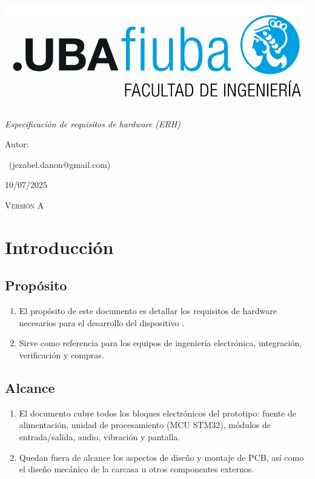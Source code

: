 \documentclass[11pt,a4paper]{article}
\newcommand{\versionActual}{A}
\newcommand{\fechaA}{10/07/2025}
\newcommand{\fechaActual}{\fechaA}
\begin{document}
\begin{titlepage}
  \centering
  \includegraphics[width=.7\textwidth]{../Figuras/logoFIUBA.pdf}\par
  \vspace{1cm}
  {\Huge\textbf{\ttitle}}\par
  \vspace{1.5cm}
  {\Large\itshape Especificación de requisitos de hardware (ERH)\par}
  \vspace{3cm}
  \flushleft
  {\normalsize Autor:}\par
  {\Large \authorname\ (jezabel.danon@gmail.com)}\par
  \vspace{1.5cm}
  {\scshape\LARGE \fechaActual}\par
  {\scshape\LARGE Versión \versionActual}\par
  \vfill
  \centering
  \textit{}%
\end{titlepage}

\clearpage
\tableofcontents
\clearpage

\section{Introducción}

\subsection{Propósito}
\begin{enumerate}
  \item El propósito de este documento es detallar los requisitos de hardware necesarios
para el desarrollo del dispositivo \textit{\ttitle}.  
  \item Sirve como referencia para los equipos de ingeniería electrónica,
integración, verificación y compras.
\end{enumerate}

\subsection{Alcance}
\begin{enumerate}
  \item El documento cubre todos los bloques electrónicos del prototipo: fuente de alimentación, unidad de procesamiento (MCU STM32), módulos de entrada/salida, audio, vibración y pantalla.
  \item Quedan fuera de alcance los aspectos de diseño y montaje de PCB, así como el diseño mecánico de la carcasa u otros componentes externos.
\end{enumerate}
\end{document}
